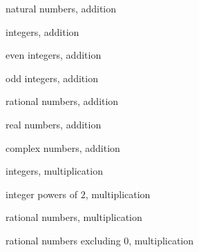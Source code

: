 \documentclass[../gatm_answers.tex]{subfiles}
\begin{document}
\begin{inner_problem}
\item natural numbers, addition
\end{inner_problem}

\begin{inner_problem}
\item integers, addition
\end{inner_problem}

\begin{inner_problem}
\item even integers, addition
\end{inner_problem}

\begin{inner_problem}
\item odd integers, addition
\end{inner_problem}

\begin{inner_problem}
\item rational numbers, addition
\end{inner_problem}

\begin{inner_problem}
\item real numbers, addition
\end{inner_problem}

\begin{inner_problem}
\item complex numbers, addition
\end{inner_problem}

\begin{inner_problem}
\item integers, multiplication
\end{inner_problem}

\begin{inner_problem}
\item integer powers of $2$, multiplication
\end{inner_problem}

\begin{inner_problem}
\item rational numbers, multiplication
\end{inner_problem}

\begin{inner_problem}
\item rational numbers excluding $0$, multiplication
\end{inner_problem}
\end{document}
